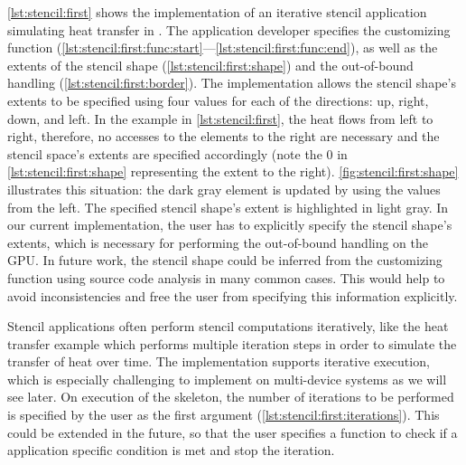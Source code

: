 \autoref{lst:stencil:first} shows the implementation of an iterative stencil application simulating heat transfer in \SkelCL.
The application developer specifies the customizing function (\autoref{lst:stencil:first:func:start}---\autoref{lst:stencil:first:func:end}), as well as the extents of the stencil shape (\autoref{lst:stencil:first:shape}) and the out-of-bound handling (\autoref{lst:stencil:first:border}).
The  implementation allows the stencil shape's extents to be specified using four values for each of the directions:
up, right, down, and left.
In the example in \autoref{lst:stencil:first}, the heat flows from left to right, therefore, no accesses to the elements to the right are necessary and the stencil space's extents are specified accordingly (note the $0$ in \autoref{lst:stencil:first:shape} representing the extent to the right).
\autoref{fig:stencil:first:shape} illustrates this situation: the dark gray element is updated by using the values from the left.
The specified stencil shape's extent is highlighted in light gray.
In our current implementation, the user has to explicitly specify the stencil shape's extents, which is necessary for performing the out-of-bound handling on the GPU.
In future work, the stencil shape could be inferred from the customizing function using source code analysis in many common cases.
This would help to avoid inconsistencies and free the user from specifying this information explicitly.

Stencil applications often perform stencil computations iteratively, like the heat transfer example which performs multiple iteration steps in order to simulate the transfer of heat over time.
The  implementation supports iterative execution, which is especially challenging to implement on multi-device systems as we will see later.
On execution of the skeleton, the number of iterations to be performed is specified by the user as the first argument (\autoref{lst:stencil:first:iterations}).
This could be extended in the future, so that the user specifies a function to check if a application specific condition is met and stop the iteration.


